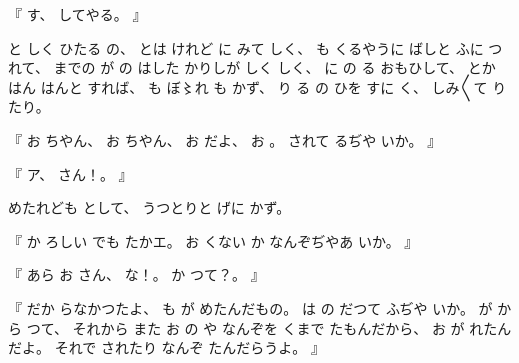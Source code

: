 %
『
す、
%
してやる。
』

%
と
しく
ひたる
の、
%
とは
けれど
に
みて
しく、
%
%
も
くるやうに
ばしと
ふに
つれて、
%
までの
が
の
はした
かりしが
しく
しく、
%
に
の
る
おもひして、
%
とか
はん
はんと
すれば、
%
も
ぼ〻れ%
も
かず、
%
%
り
る
の
ひを
すに
く、
%
しみ〳〵て
りたり。

%
『
お
ちやん、
%
お
ちやん、
%
お
だよ、
%
お
。
%
されて%
るぢや
いか。
』

%
『
ア、
%
さん！。
』

%
めたれども
として、
%
うつとりと
げに
かず。

%
『
か
ろしい
でも
たかエ。
%
お
くない
か
なんぞぢやあ
いか。
』

%
『
あら
お
さん、
%
な！。
%
か
つて？。
』

%
『
だか
らなかつたよ、
%
も
が
めたんだもの。
%
は
の
だつて
ふぢや
いか。
%
が
から
つて、
%
それから
また
お
の
や
なんぞを
くまで
たもんだから、
%
お
が
れたんだよ。
%
それで
されたり
なんぞ
たんだらうよ。
』

